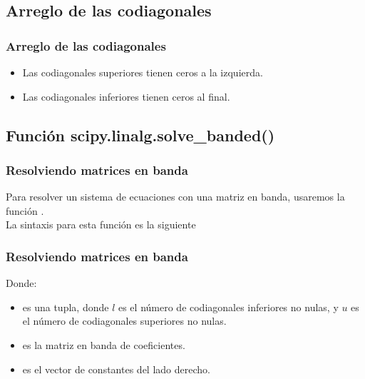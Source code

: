 \subsection{Arreglo de las codiagonales}
\begin{frame}
\frametitle{Arreglo de las codiagonales}
\begin{figure}
	\centering
	    
\end{figure}
\begin{itemize}
\item Las codiagonales superiores tienen ceros a la izquierda.
\item Las codiagonales inferiores tienen ceros al final.
\end{itemize}
\end{frame}
\subsection{Función scipy.linalg.solve\_banded()}
\begin{frame}[fragile]
\frametitle{Resolviendo matrices en banda}
Para resolver un sistema de ecuaciones con una matriz en banda, usaremos la función .
\\
\bigskip
\pause
La sintaxis para esta función es la siguiente
\begin{alltt}
\end{alltt}
\end{frame}
\begin{frame}[fragile]
\frametitle{Resolviendo matrices en banda}
\begin{alltt}
\end{alltt}
Donde:
\begin{itemize}[<+->]
\item {} es una tupla, donde $l$ es el número de codiagonales inferiores no nulas, y $u$ es el número de codiagonales superiores no nulas.
\item {} es la matriz en banda de coeficientes.
\item {} es el vector de constantes del lado derecho.
\end{itemize}
\end{frame}
